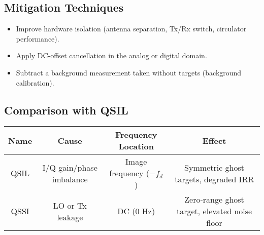 \documentclass{article}
\begin{document}
\subsection{Mitigation Techniques}

\begin{itemize}
    \item Improve hardware isolation (antenna separation, Tx/Rx switch, circulator performance).
    \item Apply DC-offset cancellation in the analog or digital domain.
    \item Subtract a background measurement taken without targets (background calibration).
\end{itemize}

\subsection{Comparison with QSIL}

\begin{table}[h!]
\centering
\begin{tabular}{|c|c|c|c|}
\hline
\textbf{Name} & \textbf{Cause} & \textbf{Frequency Location} & \textbf{Effect} \\
\hline
QSIL & I/Q gain/phase imbalance & Image frequency (\(-f_d\)) & Symmetric ghost targets, degraded IRR \\
\hline
QSSI & LO or Tx leakage & DC (0 Hz) & Zero-range ghost target, elevated noise floor \\
\hline
\end{tabular}
\end{table}
\end{document}
